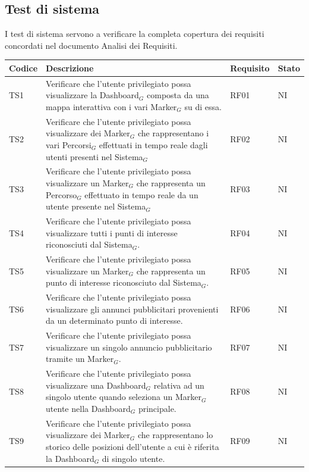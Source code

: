 \documentclass[10pt]{article}
\begin{document}
\begin{justify}
\subsection{Test di sistema}
I test di sistema servono a verificare la completa copertura dei requisiti concordati nel documento Analisi dei Requisiti.\\

\begin{longtable}{|>{\centering\arraybackslash}m{2cm}|>{\centering\arraybackslash}m{7cm}|>{\centering\arraybackslash}m{2cm}|>{\centering\arraybackslash}m{2cm}|}
\hline
\textbf{Codice} & \textbf{Descrizione} & \textbf{Requisito} & \textbf{Stato}\\
\endhead
\hline
TS1 & Verificare che l'utente privilegiato possa visualizzare la Dashboard$_G$ composta da una mappa interattiva con i vari Marker$_G$ su di essa. & RF01 & NI \\
\hline
TS2 & Verificare che l'utente privilegiato possa visualizzare dei Marker$_G$ che rappresentano i vari Percorsi$_G$ effettuati in tempo reale dagli utenti presenti nel Sistema$_G$ & RF02 & NI \\
\hline
TS3 & Verificare che l'utente privilegiato possa visualizzare un Marker$_G$ che rappresenta un Percorso$_G$ effettuato in tempo reale da un utente presente nel Sistema$_G$ & RF03 & NI \\
\hline
TS4 & Verificare che l'utente privilegiato possa visualizzare tutti i punti di interesse riconosciuti dal Sistema$_G$. & RF04 & NI \\
\hline
TS5 & Verificare che l'utente privilegiato possa visualizzare un Marker$_G$ che rappresenta un punto di interesse riconosciuto dal Sistema$_G$. & RF05 & NI \\
\hline
TS6 & Verificare che l'utente privilegiato possa visualizzare gli annunci pubblicitari provenienti da un determinato punto di interesse. & RF06 & NI \\
\hline
TS7 & Verificare che l'utente privilegiato possa visualizzare un singolo annuncio pubblicitario tramite un Marker$_G$. & RF07 & NI \\
\hline
TS8 & Verificare che l'utente privilegiato possa visualizzare una Dashboard$_G$ relativa ad un singolo utente quando seleziona un Marker$_G$ utente nella Dashboard$_G$ principale. & RF08 & NI \\
\hline
TS9 & Verificare che l'utente privilegiato possa visualizzare dei Marker$_G$ che rappresentano lo storico delle posizioni dell'utente a cui è riferita la Dashboard$_G$ di singolo utente. & RF09 & NI \\

\end{longtable}
\end{justify}
\end{document}
